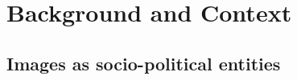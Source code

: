 \section{Background and Context}
\label{background}




\subsection{Images as socio-political entities}
\label{discursive-approaches}


